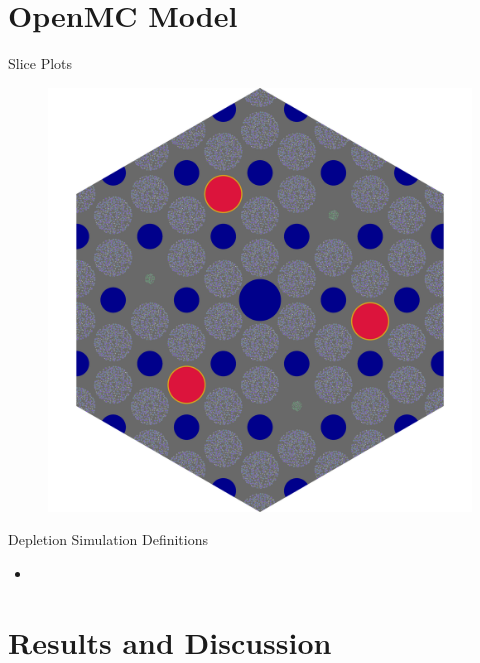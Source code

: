 \documentclass[9pt,t,aspectratio=169]{beamer}
\begin{document}
\section{OpenMC Model}

\begin{frame}{Slice Plots}
    \begin{figure}
        \includegraphics[height=0.8\textheight]{figures/gcmr_slice.png}
    \end{figure}
\end{frame}


\begin{frame}{Depletion Simulation Definitions}
    \begin{itemize}
        \item
    \end{itemize}
\end{frame}

\section{Results and Discussion}
\end{document}
